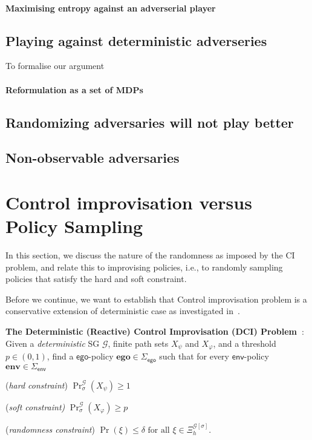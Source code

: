 \documentclass[conference]{IEEEtran}
\theoremstyle{remark}
\newcommand{\sg}{\mathcal{G}}
\renewcommand{\path}{\xi}
\newcommand{\sched}{\sigma}
\newcommand{\scthreshold}{p}
\newcommand{\pOneSched}{\mathbf{ego}}
\newcommand{\POneScheds}{\Sigma_\pOne}
\newcommand{\PTwoScheds}{\Sigma_\pTwo}
\newcommand{\pTwoSched}{\mathbf{env}}
\newcommand{\pOne}{\mathsf{ego}}
\newcommand{\pTwo}{\mathsf{env}}
\newcommand{\pathslbl}{\Xi}
\newcommand{\Paths}[2][]{\pathslbl^{#2}_{#1}}
\begin{document}
\paragraph{Maximising entropy against an adverserial player}

\subsection{Playing against deterministic adverseries}
To formalise our argument
\paragraph{Reformulation as a set of MDPs}

\paragraph{}


\subsection{Randomizing adversaries will not play better}

\subsection{Non-observable adversaries}

\section{Control improvisation versus Policy Sampling}
In this section, we discuss the nature of the randomness as imposed by the CI problem, and relate this to improvising policies, i.e., to randomly sampling policies that satisfy the hard and soft constraint.


Before we continue, we want to establish that Control improvisation problem is a conservative extension of deterministic case as investigated in~\cite{}.
\begin{mdframed}
\textbf{The Deterministic (Reactive) Control Improvisation (DCI) Problem~\cite{}}:
Given a \emph{deterministic} SG $\sg$, finite path sets $X_\psi$ and $X_\varphi$, and a threshold $p \in (0,1)$,  find a $\pOne$-policy $\pOneSched \in \POneScheds$  such that for every $\pTwo$-policy $\pTwoSched \in \PTwoScheds$ 
\begin{compactenum}
\item (\emph{hard constraint}) $\Pr^\sg_{\sched}(X_\psi) \geq 1$
	\item (\emph{soft constraint)} $\Pr^\sg_{\sched}(X_\varphi) \geq \scthreshold$
	\item (\emph{randomness constraint}) $\Pr(\path) \leq \delta \text{ for all } \path \in \Paths[h]{\sg[\sched]}$.
\end{compactenum}
\end{mdframed}
\end{document}
